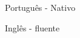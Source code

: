 
\begin{cventries}
  \cventry
  {}
  {
    \begin{cvitems} %
      \item {Português - Nativo}
      \item {Inglês - fluente}
    \end{cvitems}
  }
  {} {} {}

\end{cventries}